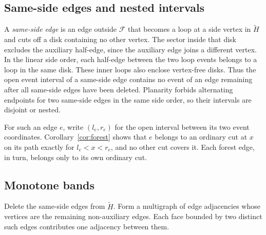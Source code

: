 \documentclass[10pt,letterpaper]{article}
\newcommand{\forest}{\mathcal F}
\begin{document}
\subsection{Same-side edges and nested intervals}
A \emph{same-side edge} is an edge outside \(\forest\) that becomes a loop at a side vertex in \(\widetilde H\) and cuts off a disk containing no other vertex. The sector inside that disk excludes the auxiliary half-edge, since the auxiliary edge joins a different vertex. In the linear side order, each half-edge between the two loop events belongs to a loop in the same disk. These inner loops also enclose vertex-free disks. Thus the open event interval of a same-side edge contains no event of an edge remaining after all same-side edges have been deleted. Planarity forbids alternating endpoints for two same-side edges in the same side order, so their intervals are disjoint or nested.

For such an edge \(e\), write \((l_e,r_e)\) for the open interval between its two event coordinates. Corollary~\ref{cor:forest} shows that \(e\) belongs to an ordinary cut at \(x\) on its path exactly for \(l_e<x<r_e\), and no other cut covers it. Each forest edge, in turn, belongs only to its own ordinary cut.

\subsection{Monotone bands}
Delete the same-side edges from \(\widetilde H\). Form a multigraph of edge adjacencies whose vertices are the remaining non-auxiliary edges. Each face bounded by two distinct such edges contributes one adjacency between them.
\end{document}
